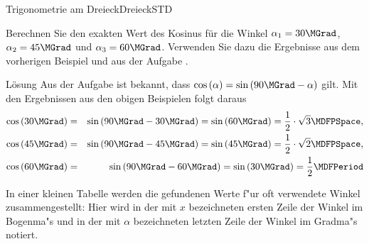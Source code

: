 \begin{MXContent}{Trigonometrie am Dreieck}{Dreieck}{STD}
\begin{MExercise}
Berechnen Sie den exakten Wert des Kosinus f\"ur die Winkel 
$\alpha_1=30\MGrad$, $\alpha_2=45\MGrad$ und $\alpha_3=60\MGrad$. 
Verwenden Sie dazu die Ergebnisse aus dem vorherigen Beispiel und aus der
Aufgabe .

\begin{MHint}{L\"osung}
Aus der Aufgabe  ist bekannt, 
dass $\cos\left(\alpha\right)= \sin\left(90\MGrad-\alpha\right)$ gilt.
Mit den Ergebnissen aus den obigen Beispielen folgt daraus
\begin{eqnarray*}
\cos\left(30\MGrad\right) %
 & = & \sin\left(90\MGrad-30\MGrad\right) %
 =\sin\left(60\MGrad\right) %
 =\frac{1}{2}\cdot\sqrt{3} \MDFPSpace, \\
%
\cos\left(45\MGrad\right)
 & = & \sin\left(90\MGrad-45\MGrad\right) %
 =\sin\left(45\MGrad\right) %
 =\frac{1}{2}\cdot\sqrt{2} \MDFPSpace, \\
%
\cos\left(60\MGrad\right) %
 & = & \sin\left(90\MGrad-60\MGrad\right) %
 =\sin\left(30\MGrad\right) %
 =\frac{1}{2} \MDFPeriod \\
\end{eqnarray*}
\end{MHint}
\end{MExercise}

In einer kleinen Tabelle werden die gefundenen Werte f"ur oft verwendete Winkel 
zusammengestellt:
Hier wird in der mit $x$ bezeichneten ersten Zeile der Winkel im Bogenma"s und 
in der mit $\alpha$ bezeichneten letzten Zeile der Winkel im Gradma"s notiert.


\end{MXContent}
